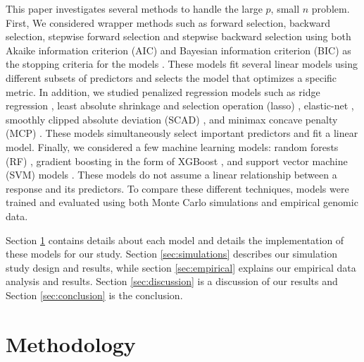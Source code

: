 \documentclass{article}
\begin{document}

This paper investigates several methods to handle the large $p$, small $n$ problem. First, We considered wrapper methods such as forward selection, backward selection, stepwise forward selection and stepwise backward selection using both Akaike information criterion (AIC) and Bayesian information criterion (BIC) as the stopping criteria for the models \cite{akaike1998information, schwarz1978estimating}. These models fit several linear models using different subsets of predictors and selects the model that optimizes a specific metric. In addition, we studied penalized regression models such as ridge regression \cite{hoerl1970ridge}, least absolute shrinkage and selection operation (lasso) \cite{tibshirani1996regression}, elastic-net \cite{zou2005regularization}, smoothly clipped absolute deviation (SCAD) \cite{fan2001variable}, and minimax concave penalty (MCP) \cite{zhang2010nearly}. These models simultaneously select important predictors and fit a linear model. Finally, we considered a few machine learning models: random forests (RF) \cite{breiman2001random}, gradient boosting in the form of XGBoost \cite{chen2021xgboost}, and support vector machine (SVM) models \cite{cortes1995support}. These models do not assume a linear relationship between a response and its predictors. To compare these different techniques, models were trained and evaluated using both Monte Carlo simulations and empirical genomic data.

Section \ref{sec:methodology} contains details about each model and details the implementation of these models for our study. Section \ref{sec:simulations} describes our simulation study design and results, while section \ref{sec:empirical} explains our empirical data analysis and results. Section \ref{sec:discussion} is a discussion of our results and Section \ref{sec:conclusion} is the conclusion.

\section{Methodology}\label{sec:methodology}
\end{document}
